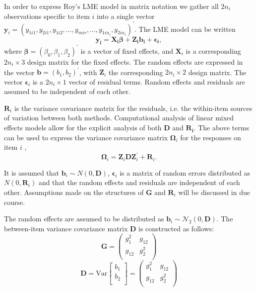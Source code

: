 \documentclass[12pt, a4paper]{report}
\theoremstyle{plain}
\theoremstyle{definition}
\theoremstyle{remark}
\begin{document}
	
	
	
	
	
	
	In order to express Roy's LME model in matrix notation we gather all $2n_i$ observations specific to item $i$ into a single vector  $\boldsymbol{y}_{i} = (y_{1i1},y_{2i1},y_{1i2},\ldots,y_{mir},\ldots,y_{1in_{i}},y_{2in_{i}})^\prime.$ The LME model can be written
	\[
	\boldsymbol{y_{i}} = \boldsymbol{X_{i}\beta} + \boldsymbol{Z_{i}b_{i}} + \boldsymbol{\epsilon_{i}},
	\]
	where $\boldsymbol{\beta}=(\beta_0,\beta_1,\beta_2)^\prime$ is a vector of fixed effects, and $\boldsymbol{X}_i$ is a corresponding $2n_i\times 3$ design matrix for the fixed effects. The random effects are expressed in the vector $\boldsymbol{b}=(b_1,b_2)^\prime$, with $\boldsymbol{Z}_i$ the corresponding $2n_i\times 2$ design matrix. The vector $\boldsymbol{\epsilon}_i$ is a $2n_i\times 1$ vector of residual terms. Random effects and residuals are assumed to be independent of each other.
	
	$\boldsymbol{R}_{i}$ is the variance covariance matrix for the residuals, i.e. the within-item sources of variation between both methods. Computational analysis of linear mixed effects models allow for the explicit analysis of both $\boldsymbol{D}$ and $\boldsymbol{R_i}$.
	The above terms can be used to express the  variance covariance matrix $\boldsymbol{\Omega}_i$ for the responses on item $i$ ,
	\[
	\boldsymbol{\Omega}_i = \boldsymbol{Z}_i \boldsymbol{D} \boldsymbol{Z}_i^{\prime} + \boldsymbol{R}_i.
	\]
	
	It is assumed that $\boldsymbol{b}_i \sim N(0,\boldsymbol{D})$, $\boldsymbol{\epsilon}_i$ is a matrix of random errors distributed as $N(0,\boldsymbol{R}_i)$ and that the random effects and residuals are independent of each other. Assumptions made on the structures of $\boldsymbol{G}$ and $\boldsymbol{R}_i$ will be discussed in due course.
	
	The random effects are assumed to be distributed as $\boldsymbol{b}_i \sim \mathcal{N}_2(0,\boldsymbol{D})$. The between-item variance covariance matrix $\boldsymbol{D}$ is constructed as follows:
	\[ \boldsymbol{G} =\left(
	\begin{array}{cc}
	g^2_1  & g_{12} \\
	g_{12} & g^2_2 \\
	\end{array}
	\right) \]
	\[ \boldsymbol{D} = \mbox{Var}  \left[
	\begin{array}{c}
	b_1   \\
	b_2  \\
	\end{array}
	\right] =  \left(
	\begin{array}{cc}
	g^2_1  & g_{12} \\
	g_{12} & g^2_2 \\
	\end{array}
	\right) \]
	
\end{document}
